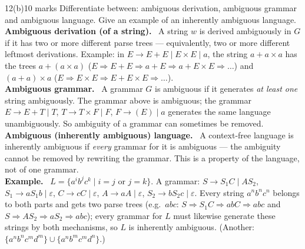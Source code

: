 \documentclass[10.5pt,a4paper]{article}
\newcommand{\ansh}[1]{\textbf{\color{exborder}#1}\ }
\newcommand{\eps}{\varepsilon}
\begin{document}
\begin{qa}{12(b)}{10 marks}
Differentiate between: ambiguous derivation, ambiguous grammar and ambiguous language. Give an example of an inherently ambiguous language.
\tcblower
\ansh{Ambiguous derivation (of a string).} A string $w$ is derived ambiguously in $G$ if it has two or more different parse trees --- equivalently,
two or more different leftmost derivations. Example: in $E\to E+E\mid E\times E\mid a$, the string $a+a\times a$ has the trees $a+(a\times a)$
($E\Rightarrow E+E\Rightarrow a+E\Rightarrow a+E\times E\Rightarrow\dots$) and $(a+a)\times a$ ($E\Rightarrow E\times E\Rightarrow E+E\times E\Rightarrow\dots$).\\
\ansh{Ambiguous grammar.} A grammar $G$ is ambiguous if it generates \emph{at least one} string ambiguously. The grammar above is ambiguous; the
grammar $E\to E+T\mid T$, $T\to T\times F\mid F$, $F\to(E)\mid a$ generates the same language unambiguously. So ambiguity of a grammar can sometimes be
removed.\\
\ansh{Ambiguous (inherently ambiguous) language.} A context-free language is inherently ambiguous if \emph{every} grammar for it is ambiguous ---
the ambiguity cannot be removed by rewriting the grammar. This is a property of the language, not of one grammar.\\
\ansh{Example.} $L=\{a^ib^jc^k\mid i=j\text{ or }j=k\}$. A grammar: $S\to S_1C\mid AS_2$, $S_1\to aS_1b\mid\eps$, $C\to cC\mid\eps$,
$A\to aA\mid\eps$, $S_2\to bS_2c\mid\eps$. Every string $a^nb^nc^n$ belongs to both parts and gets two parse trees (e.g.\ $abc$:
$S\Rightarrow S_1C\Rightarrow abC\Rightarrow abc$ and $S\Rightarrow AS_2\Rightarrow aS_2\Rightarrow abc$); every grammar for $L$ must likewise generate
these strings by both mechanisms, so $L$ is inherently ambiguous. (Another: $\{a^nb^nc^md^m\}\cup\{a^nb^mc^md^n\}$.)
\end{qa}
\end{document}
